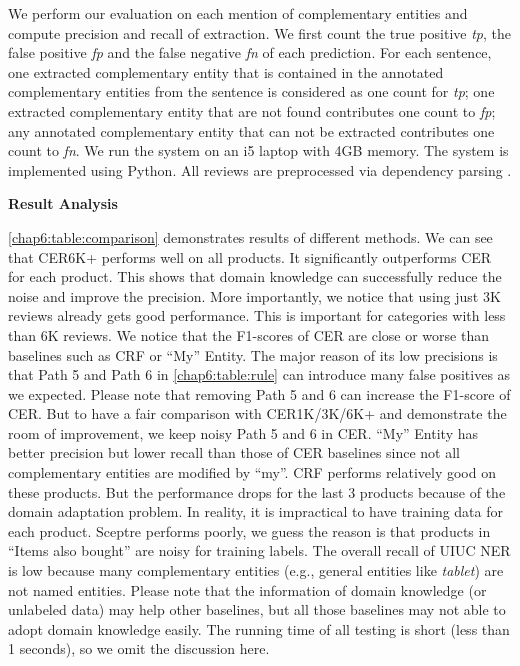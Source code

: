 We perform our evaluation on each mention of complementary entities and compute precision and recall of extraction. We first count the true positive \textit{tp}, the false positive \textit{fp} and the false negative \textit{fn} of each prediction. For each sentence, one extracted complementary entity that is contained in the annotated complementary entities from the sentence is considered as one count for \textit{tp}; one extracted complementary entity that are not found contributes one count to \textit{fp}; any annotated complementary entity that can not be extracted contributes one count to \textit{fn}. We run the system on an i5 laptop with 4GB memory. The system is implemented using Python. All reviews are preprocessed via dependency parsing \cite{de2008stanford}. 

\textbf{Result Analysis}

\ref{chap6:table:comparison} demonstrates results of different methods. We can see that CER6K+ performs well on all products. It significantly outperforms CER for each product. This shows that domain knowledge can successfully reduce the noise and improve the precision. More importantly, we notice that using just 3K reviews already gets good performance. This is important for categories with less than 6K reviews. We notice that the F1-scores of CER are close or worse than baselines such as CRF or ``My'' Entity. The major reason of its low precisions is that Path 5 and Path 6 in \ref{chap6:table:rule} can introduce many false positives as we expected. Please note that removing Path 5 and 6 can increase the F1-score of CER. But to have a fair comparison with CER1K/3K/6K+ and demonstrate the room of improvement, we keep noisy Path 5 and 6 in CER. ``My'' Entity has better precision but lower recall than those of CER baselines since not all complementary entities are modified by ``my''. CRF performs relatively good on these products. But the performance drops for the last 3 products because of the domain adaptation problem. In reality, it is impractical to have training data for each product. Sceptre performs poorly, we guess the reason is that products in ``Items also bought'' are noisy for training labels. The overall recall of UIUC NER is low because many complementary entities (e.g., general entities like \textit{tablet}) are not named entities. Please note that the information of domain knowledge (or unlabeled data) may help other baselines, but all those baselines may not able to adopt domain knowledge easily. The running time of all testing is short (less than 1 seconds), so we omit the discussion here.

